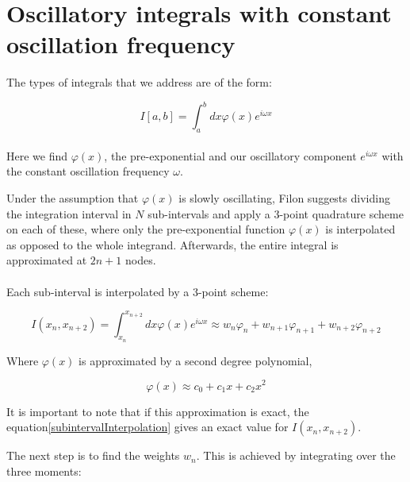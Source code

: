 
\section{Oscillatory integrals with constant oscillation
 frequency}


The types of integrals that we address are of the form:

\begin{equation}
    I[a,b] = \int_a^b dx \varphi(x)e^{i\omega x}\label{oscillatoryIntegral}
\end{equation}

\paragraph{}Here we find $\varphi(x)$, the pre-exponential and our oscillatory component $e^{i\omega x}$ with the constant oscillation frequency $\omega$.

Under the assumption that $\varphi(x)$ is slowly oscillating, Filon suggests dividing the integration interval in $N$ sub-intervals and apply a 3-point quadrature scheme on each of these, where only the pre-exponential function $\varphi(x)$ is interpolated as opposed to the whole integrand.\cite{num}
Afterwards, the entire integral is approximated at $2n+1$ nodes. 

\paragraph{}Each sub-interval is interpolated by a 3-point scheme:

\begin{equation}
    I(x_n,x_{n+2}) = \int_{x_n}^{x_{n+2}} dx \varphi(x)e^{i\omega x} \approx w_n\varphi_n+w_{n+1}\varphi_{n+1}+w_{n+2}\varphi_{n+2}\label{subintervalInterpolation}
\end{equation}

Where $\varphi(x)$ is approximated by a second degree polynomial, 

\begin{equation}
    \varphi(x) \approx c_0 + c_1x + c_2x^2\label{IntegrandAproximation}
\end{equation}

It is important to note that if this approximation is exact, the equation\eqref{subintervalInterpolation} gives an exact value for $I(x_n,x_{n+2})$.

The next step is to find the weights $w_n$. This is achieved by integrating over the three moments: 

